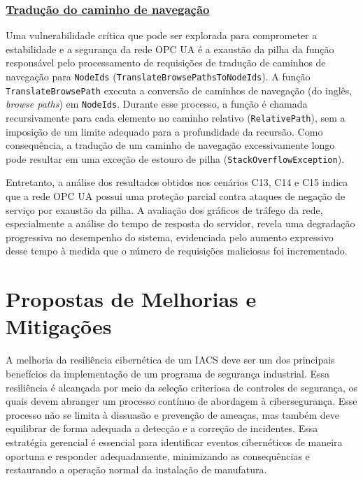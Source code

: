         \subsubsection*{\underline{Tradução do caminho de navegação}}

            Uma vulnerabilidade crítica que pode ser explorada para comprometer a estabilidade e a segurança da rede OPC UA é a exaustão da pilha da função responsável pelo processamento de requisições de tradução de caminhos de navegação para \texttt{NodeIds} (\texttt{TranslateBrowsePathsToNodeIds}). A função \texttt{TranslateBrowsePath} executa a conversão de caminhos de navegação (do inglês, \textit{browse paths}) em \texttt{NodeIds}. Durante esse processo, a função é chamada recursivamente para cada elemento no caminho relativo (\texttt{RelativePath}), sem a imposição de um limite adequado para a profundidade da recursão. Como consequência, a tradução de um caminho de navegação excessivamente longo pode resultar em uma exceção de estouro de pilha (\texttt{StackOverflowException}).

            Entretanto, a análise dos resultados obtidos nos cenários C13, C14 e C15 indica que a rede OPC UA possui uma proteção parcial contra ataques de negação de serviço por exaustão da pilha. A avaliação dos gráficos de tráfego da rede, especialmente a análise do tempo de resposta do servidor, revela uma degradação progressiva no desempenho do sistema, evidenciada pelo aumento expressivo desse tempo à medida que o número de requisições maliciosas foi incrementado.        

\section{Propostas de Melhorias e Mitigações} \label{sec:melhorias-mitigacoes}

    A melhoria da resiliência cibernética de um IACS deve ser um dos principais benefícios da implementação de um programa de segurança industrial. Essa resiliência é alcançada por meio da seleção criteriosa de controles de segurança, os quais devem abranger um processo contínuo de abordagem à cibersegurança. Esse processo não se limita à dissuasão e prevenção de ameaças, mas também deve equilibrar de forma adequada a detecção e a correção de incidentes. Essa estratégia gerencial é essencial para identificar eventos cibernéticos de maneira oportuna e responder adequadamente, minimizando as consequências e restaurando a operação normal da instalação de manufatura.

